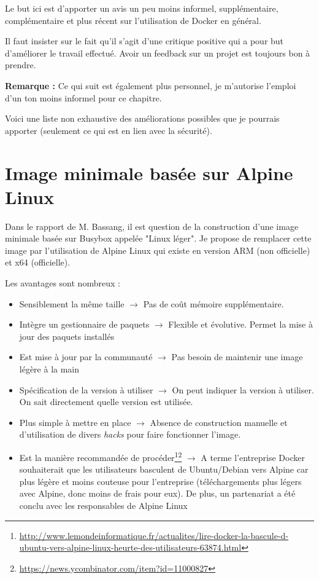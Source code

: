 \documentclass[11pt,a4paper,oneside]{report}
\begin{document}
Le but ici est d'apporter un avis un peu moins informel, supplémentaire, complémentaire et plus récent sur l'utilisation de Docker en général.

Il faut insister sur le fait qu'il s'agit d'une critique positive qui a pour but d'améliorer le travail effectué. Avoir un feedback sur un projet est toujours bon à prendre.

\textbf{Remarque :} Ce qui suit est également plus personnel, je m'autorise l'emploi d'un ton moins informel pour ce chapitre.

Voici une liste non exhaustive des améliorations possibles que je pourrais apporter (seulement ce qui est en lien avec la sécurité).

\section{Image minimale basée sur Alpine Linux}
Dans le rapport de M. Bassang, il est question de la construction d'une image minimale basée sur Busybox appelée "Linux léger". Je propose de remplacer cette image par l'utilisation de Alpine Linux qui existe en version ARM (non officielle) et x64 (officielle).

Les avantages sont nombreux :

\begin{itemize}
\item Sensiblement la même taille $\to$ Pas de coût mémoire supplémentaire.

\item Intègre un gestionnaire de paquets $\to$ Flexible et évolutive. Permet la mise à jour des paquets installés

\item Est mise à jour par la communauté $\to$ Pas besoin de maintenir une image légère à la main

\item Spécification de la version à utiliser $\to$ On peut indiquer la version à utiliser. On sait directement quelle version est utilisée.

\item Plus simple à mettre en place $\to$ Absence de construction manuelle et d'utilisation de divers \textit{hacks} pour faire fonctionner l'image.

\item Est la manière recommandée de procéder\footnote{\url{http://www.lemondeinformatique.fr/actualites/lire-docker-la-bascule-d-ubuntu-vers-alpine-linux-heurte-des-utilisateurs-63874.html}}\footnote{\url{https://news.ycombinator.com/item?id=11000827}} $\to$ A terme l'entreprise Docker souhaiterait que les utilisateurs basculent de Ubuntu/Debian vers Alpine car plus légère et moins couteuse pour l'entreprise (téléchargements plus légers avec Alpine, donc moins de frais pour eux). De plus, un partenariat a été conclu avec les responsables de Alpine Linux

\end{itemize}
\end{document}
